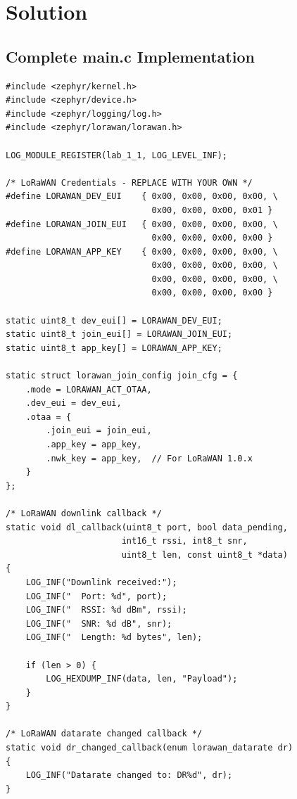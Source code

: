 \documentclass[11pt,a4paper]{article}
\begin{document}
\section{Solution}

\begin{solutionbox}

\subsection{Complete main.c Implementation}

\begin{lstlisting}
#include <zephyr/kernel.h>
#include <zephyr/device.h>
#include <zephyr/logging/log.h>
#include <zephyr/lorawan/lorawan.h>

LOG_MODULE_REGISTER(lab_1_1, LOG_LEVEL_INF);

/* LoRaWAN Credentials - REPLACE WITH YOUR OWN */
#define LORAWAN_DEV_EUI    { 0x00, 0x00, 0x00, 0x00, \
                             0x00, 0x00, 0x00, 0x01 }
#define LORAWAN_JOIN_EUI   { 0x00, 0x00, 0x00, 0x00, \
                             0x00, 0x00, 0x00, 0x00 }
#define LORAWAN_APP_KEY    { 0x00, 0x00, 0x00, 0x00, \
                             0x00, 0x00, 0x00, 0x00, \
                             0x00, 0x00, 0x00, 0x00, \
                             0x00, 0x00, 0x00, 0x00 }

static uint8_t dev_eui[] = LORAWAN_DEV_EUI;
static uint8_t join_eui[] = LORAWAN_JOIN_EUI;
static uint8_t app_key[] = LORAWAN_APP_KEY;

static struct lorawan_join_config join_cfg = {
    .mode = LORAWAN_ACT_OTAA,
    .dev_eui = dev_eui,
    .otaa = {
        .join_eui = join_eui,
        .app_key = app_key,
        .nwk_key = app_key,  // For LoRaWAN 1.0.x
    }
};

/* LoRaWAN downlink callback */
static void dl_callback(uint8_t port, bool data_pending,
                       int16_t rssi, int8_t snr,
                       uint8_t len, const uint8_t *data)
{
    LOG_INF("Downlink received:");
    LOG_INF("  Port: %d", port);
    LOG_INF("  RSSI: %d dBm", rssi);
    LOG_INF("  SNR: %d dB", snr);
    LOG_INF("  Length: %d bytes", len);

    if (len > 0) {
        LOG_HEXDUMP_INF(data, len, "Payload");
    }
}

/* LoRaWAN datarate changed callback */
static void dr_changed_callback(enum lorawan_datarate dr)
{
    LOG_INF("Datarate changed to: DR%d", dr);
}


\end{lstlisting}
\end{solutionbox}
\end{document}
